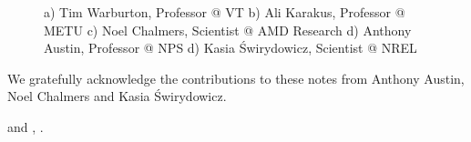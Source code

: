 \begin{figure}[h]
\begin{center}
\begin{subfigure}{0.3\textwidth}
  \caption{}
 \end{subfigure}
\caption{a) Tim Warburton, Professor @ VT b) Ali Karakus, Professor @ METU c) Noel Chalmers, Scientist @ AMD Research d) Anthony Austin, Professor @ NPS d) Kasia \'{S}wirydowicz, Scientist @ NREL }
\label{fig:SquareCylinder2DSubcycle}
\end{center}
\end{figure}




We gratefully acknowledge the contributions to these notes from Anthony Austin, Noel Chalmers and Kasia \'{S}wirydowicz. 

\autha{} and \authb{}, \semester{}.